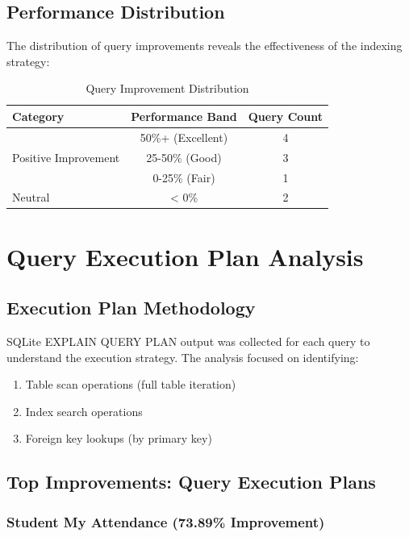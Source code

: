 \documentclass[conference]{IEEEtran}
\begin{document}
\subsection{Performance Distribution}

The distribution of query improvements reveals the effectiveness of the indexing strategy:

\begin{table}[htbp]
\caption{Query Improvement Distribution}
\begin{center}
\begin{tabular}{|l|c|c|}
\hline
\textbf{Category} & \textbf{Performance Band} & \textbf{Query Count} \\
\hline
\multirow{3}{*}{Positive Improvement} & 50\%+ (Excellent) & 4 \\
& 25-50\% (Good) & 3 \\
& 0-25\% (Fair) & 1 \\
\multirow{1}{*}{Neutral} & < 0\% & 2 \\
\hline
\end{tabular}
\label{tab:distribution}
\end{center}
\end{table}

\section{Query Execution Plan Analysis}

\subsection{Execution Plan Methodology}

SQLite EXPLAIN QUERY PLAN output was collected for each query to understand the execution strategy. The analysis focused on identifying:

\begin{enumerate}
    \item Table scan operations (full table iteration)
    \item Index search operations
    \item Foreign key lookups (by primary key)
\end{enumerate}

\subsection{Top Improvements: Query Execution Plans}

\subsubsection{Student My Attendance (73.89\% Improvement)}
\end{document}
